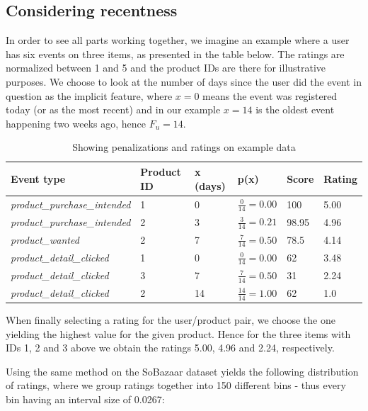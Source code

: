 \subsection{Considering recentness}

In order to see all parts working together, we imagine an example where a user
has six events on three items, as presented in the table below. The ratings are
normalized between 1 and 5 and the product IDs are there for illustrative
purposes. We choose to look at the number of days since the user did the event
in question as the implicit feature, where $x=0$ means the event was registered
today (or as the most recent) and in our example $x=14$ is the oldest event
happening two weeks ago, hence $F_u = 14$.

\begin{table}[H]
  \centering
  \begin{tabular}{llllll}
  \toprule
  Event type & Product ID & x (days) & p(x) & Score & Rating \\
  \midrule
  \textit{product\_purchase\_intended}  & 1 & 0   & $\frac{0}{14} = 0.00$  & 100 & 5.00 \\[1.5ex]
  \textit{product\_purchase\_intended}  & 2 & 3   & $\frac{3}{14} = 0.21$  & 98.95 & 4.96 \\[1.5ex]
  \textit{product\_wanted}              & 2 & 7   & $\frac{7}{14} = 0.50$  & 78.5 & 4.14 \\[1.5ex]
  \textit{product\_detail\_clicked}     & 1 & 0   & $\frac{0}{14} = 0.00$  & 62 & 3.48 \\[1.5ex]
  \textit{product\_detail\_clicked}     & 3 & 7   & $\frac{7}{14} = 0.50$  & 31 & 2.24 \\[1.5ex]
  \textit{product\_detail\_clicked}     & 2 & 14  & $\frac{14}{14} = 1.00$ & 62 & 1.0  \\
  \bottomrule
  \end{tabular}
  \caption{Showing penalizations and ratings on example data}
  \label{implicit-ratings-example}
\end{table}

When finally selecting a rating for the user/product pair, we choose the
one yielding the highest value for the given product. Hence for the three items
with IDs 1, 2 and 3 above we obtain the ratings 5.00, 4.96 and 2.24, respectively.

Using the same method on the SoBazaar dataset yields the following distribution
of ratings, where we group ratings together into 150 different bins - thus
every bin having an interval size of 0.0267:

